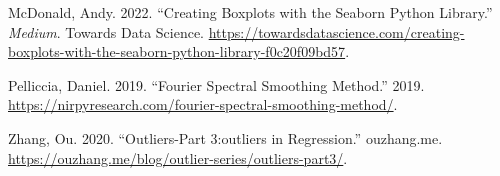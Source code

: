 \documentclass[
  letterpaper,
  DIV=11,
  numbers=noendperiod,
  oneside]{scrreprt}
\newlength{\cslhangindent}
\newlength{\cslentryspacingunit} %
\newenvironment{CSLReferences}[2] %
 {%
  \setlength{\parindent}{0pt}
  \ifodd #1
  \let\oldpar\par
  \def\par{\hangindent=\cslhangindent\oldpar}
  \fi
  \setlength{\parskip}{#2\cslentryspacingunit}
 }%
 {}
\begin{document}
\hypertarget{refs}{}
\begin{CSLReferences}{1}{0}
\leavevmode{}%
McDonald, Andy. 2022. {``Creating Boxplots with the Seaborn Python
Library.''} \emph{Medium}. Towards Data Science.
\url{https://towardsdatascience.com/creating-boxplots-with-the-seaborn-python-library-f0c20f09bd57}.

\leavevmode{}%
Pelliccia, Daniel. 2019. {``Fourier Spectral Smoothing Method.''} 2019.
\url{https://nirpyresearch.com/fourier-spectral-smoothing-method/}.

\leavevmode{}%
Zhang, Ou. 2020. {``Outliers-Part 3:outliers in Regression.''}
ouzhang.me.
\url{https://ouzhang.me/blog/outlier-series/outliers-part3/}.

\end{CSLReferences}
\end{document}
